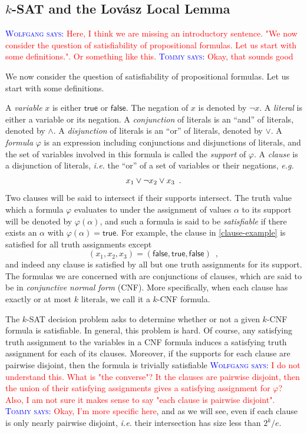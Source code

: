 \documentclass{patmorin}
\newcommand{\aremark}[3]{\textcolor{blue}{\textsc{#1 #2:}}
  \textcolor{red}{\textsf{#3}}}
\newcommand{\tommy}[2][says]{\aremark{Tommy}{#1}{#2}}
\newcommand{\wolfgang}[2][says]{\aremark{Wolfgang}{#1}{#2}}
\begin{document}
\subsection{$k$-SAT and the Lov\'{a}sz Local Lemma}

\wolfgang{Here, I think we are missing an introductory sentence.
"We now consider the question of satisfiability of propositional
formulas. Let us start with some definitions.". Or something
like this.} \tommy{Okay, that sounds good}

We now consider the question of satisfiability of propositional
formulas. Let us start with some definitions.

A \emph{variable} $x$ is either $\textsf{true}$ or
$\textsf{false}$. The negation of $x$ is denoted by $\neg x$. A
\emph{literal} is either a variable or its negation. A
\emph{conjunction} of literals is an ``and'' of literals, denoted by
$\land$. A \emph{disjunction} of literals is an ``or'' of literals,
denoted by $\lor$. A \emph{formula} $\varphi$ is an expression
including conjunctions and disjunctions of literals, and the set of
variables involved in this formula is called the \emph{support} of
$\varphi$. A \emph{clause} is a disjunction of literals, \emph{i.e.}
the ``or'' of a set of variables or their negations, \emph{e.g.}
\begin{align}
  x_1 \lor \neg x_2 \lor x_3 \enspace . \eqlabel{clause-example}
\end{align}
Two clauses will be said to intersect if their supports intersect. The
truth value which a formula $\varphi$ evaluates to under the
assignment of values $\alpha$ to its support will be denoted by
$\varphi(\alpha)$, and such a formula is said to be \emph{satisfiable}
if there exists an $\alpha$ with $\varphi(\alpha) = \textsf{true}$.
For example, the clause in \eqref{clause-example} is satisfied for all
truth assignments except
\[
  (x_1, x_2, x_3) = (\textsf{false}, \textsf{true}, \textsf{false})
  \enspace ,
\]
and indeed any clause is satisfied by all but one truth assignments
for its support. The formulas we are concerned with are conjunctions
of clauses, which are said to be in \emph{conjunctive normal form}
(CNF). More specifically, when each clause has exactly or at most $k$
literals, we call it a $k$-CNF formula.

The $k$-SAT decision problem asks to determine whether or not a given
$k$-CNF formula is satisfiable. In general, this problem is hard. Of
course, any satisfying truth assignment to the variables in a CNF
formula induces a satisfying truth assignment for each of its
clauses. Moreover, if the supports for each clause are pairwise
disjoint, then the formula is trivially satisfiable
\wolfgang{I do not understand this. What is "the converse"?  It the
  clauses are pairwise disjoint, then the union of their satisfying
  assignments gives a satisfying assignment for $\varphi$?  Also, I am
  not sure it makes sense to say "each clause is pairwise disjoint".}
\tommy{Okay, I'm more specific here}, and as we will see, even if each
clause is only nearly pairwise disjoint, \emph{i.e.}  their
intersection has size less than $2^k/e$.
\end{document}
